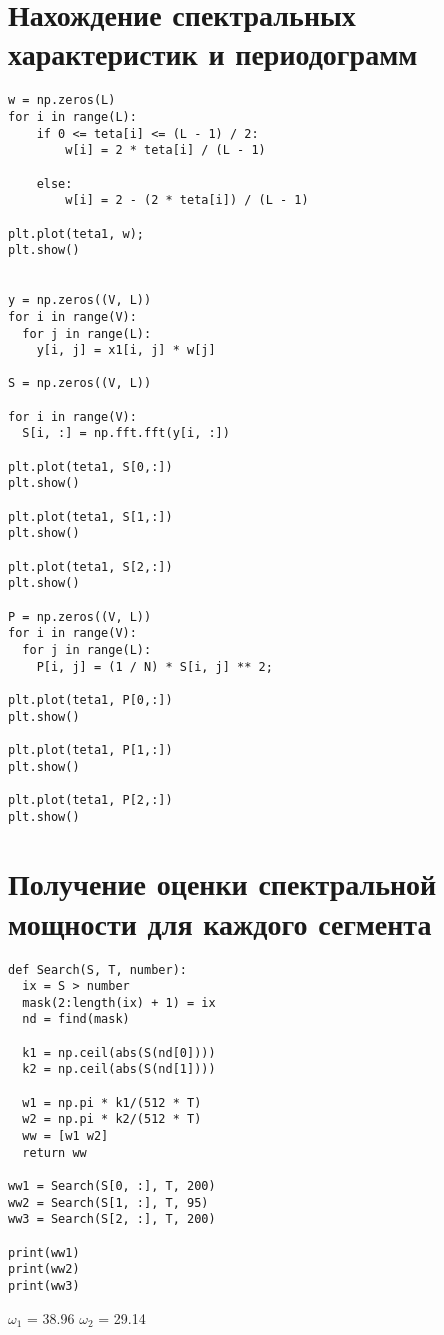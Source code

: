 \documentclass[12pt]{article}
\begin{document}
\section{ Нахождение спектральных характеристик и периодограмм}

\begin{lstlisting}
w = np.zeros(L)
for i in range(L):
    if 0 <= teta[i] <= (L - 1) / 2:
        w[i] = 2 * teta[i] / (L - 1)

    else:
        w[i] = 2 - (2 * teta[i]) / (L - 1)

plt.plot(teta1, w);
plt.show()


y = np.zeros((V, L))
for i in range(V):
  for j in range(L):
    y[i, j] = x1[i, j] * w[j]

S = np.zeros((V, L))

for i in range(V):
  S[i, :] = np.fft.fft(y[i, :])

plt.plot(teta1, S[0,:])
plt.show()

plt.plot(teta1, S[1,:])
plt.show()

plt.plot(teta1, S[2,:])
plt.show()

P = np.zeros((V, L))
for i in range(V):
  for j in range(L):
    P[i, j] = (1 / N) * S[i, j] ** 2;

plt.plot(teta1, P[0,:])
plt.show()

plt.plot(teta1, P[1,:])
plt.show()

plt.plot(teta1, P[2,:])
plt.show()
\end{lstlisting}




\section{Получение оценки спектральной мощности для каждого сегмента}

\begin{lstlisting}
def Search(S, T, number):
  ix = S > number
  mask(2:length(ix) + 1) = ix
  nd = find(mask)

  k1 = np.ceil(abs(S(nd[0])))
  k2 = np.ceil(abs(S(nd[1])))

  w1 = np.pi * k1/(512 * T)
  w2 = np.pi * k2/(512 * T)
  ww = [w1 w2]
  return ww

ww1 = Search(S[0, :], T, 200)
ww2 = Search(S[1, :], T, 95)
ww3 = Search(S[2, :], T, 200)

print(ww1)
print(ww2)
print(ww3)
\end{lstlisting}


$\omega_1$ = 38.96  
$\omega_2$ = 29.14
\end{document}
